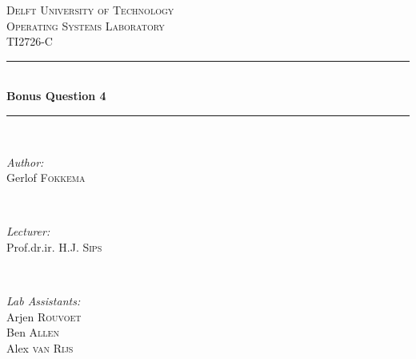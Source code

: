 \documentclass[12pt]{article}
\begin{document}
\begin{titlepage}

\newcommand{\HRule}{\rule{\linewidth}{0.5mm}} %

\center %
 

\textsc{\LARGE Delft University of Technology}\\[1.5cm] %
\textsc{\Large Operating Systems Laboratory}\\[0.5cm] %
\textsc{\large TI2726-C}\\[0.5cm] %


\HRule \\[0.4cm]
{ \huge \bfseries Bonus Question 4}\\[0.4cm] %
\HRule \\[1.5cm]
 

\begin{minipage}{0.4\textwidth}
\begin{flushleft} \large
\emph{Author:}\\
Gerlof \textsc{Fokkema} %
\end{flushleft}
\end{minipage}
~
\begin{minipage}{0.4\textwidth}
\begin{flushright} \large
\emph{Lecturer:} \\
Prof.dr.ir. H.J. \textsc{Sips} %
\end{flushright}
\end{minipage}\\[1cm]

\begin{minipage}{0.4\textwidth}
\begin{flushleft} \large
\emph{Lab Assistants:}\\
Arjen \textsc{Rouvoet}\\
Ben \textsc{Allen}\\
Alex \textsc{van Rijs} %
\end{flushleft}
\end{minipage}
~
\begin{minipage}{0.4\textwidth}
\begin{flushright} \large


\end{flushright}
\end{minipage}
\end{titlepage}
\end{document}
